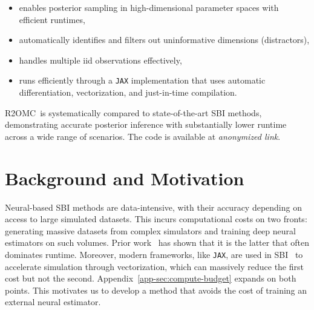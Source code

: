 \documentclass[twoside]{article}
\newcommand{\rromc}{R2OMC}
\newcommand{\LinkToCode}{\textit{anonymized link}}
\begin{document}
\begin{itemize}
 \item enables posterior sampling in high-dimensional parameter spaces with efficient runtimes,
 \item automatically identifies and filters out uninformative dimensions (distractors),
 \item handles multiple iid observations effectively,
 \item runs efficiently through a \texttt{JAX} implementation that uses automatic differentiation, vectorization, and just-in-time compilation.
 \end{itemize}

 \rromc~is systematically compared to state-of-the-art SBI methods, demonstrating accurate posterior inference with substantially lower runtime across a wide range of scenarios. The code is available at \LinkToCode.

\section{Background and Motivation}

Neural-based SBI methods are data-intensive, with their accuracy depending on access to large simulated datasets.
This incurs computational costs on two fronts:
generating massive datasets from complex simulators and
training deep neural estimators on such volumes.
Prior work~\citep{lueckmann2021benchmarking} has shown that it is the latter that often dominates runtime.
Moreover, modern frameworks, like \texttt{JAX}, are used in SBI~\citep{dirmeier2024simulation} to accelerate simulation through vectorization, which can massively reduce the first cost but not the second.
Appendix~\ref{app-sec:compute-budget} expands on both points. 
This motivates us to develop a method that avoids the cost of training an external neural estimator.
 
\end{document}
